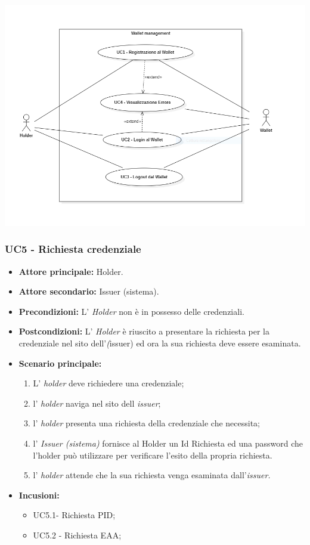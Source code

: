 \begin{center}
  \includegraphics[scale = 0.65]{./res/img/UC1.PNG}
\end{center}

\subsubsection{UC5 - Richiesta credenziale}
\begin{itemize}
\item \textbf{Attore principale:} Holder.
\item \textbf{Attore secondario:} Issuer (sistema). 
\item \textbf{Precondizioni:} L’ \textit{Holder} non è in possesso delle credenziali. 
\item \textbf{Postcondizioni:} L’ \textit{Holder} è riuscito a presentare la richiesta per la credenziale nel sito dell'\textit(issuer) ed ora la sua richiesta deve essere esaminata.
\item \textbf{Scenario principale:} 
    \begin{enumerate}
        \item L' \textit{holder} deve richiedere una credenziale; 
        \item l' \textit{holder} naviga nel sito dell \textit{issuer};
        \item l' \textit{holder} presenta una richiesta della credenziale che necessita;
        \item l' \textit{Issuer (sistema)} fornisce al Holder un Id Richiesta ed una password che l'holder può utilizzare per verificare l'esito della propria richiesta.
        \item l' \textit{holder} attende che la sua richiesta venga esaminata dall'\textit{issuer.}
    \end{enumerate}
\item \textbf{Incusioni:}
    \begin{itemize}
    \item UC5.1- Richiesta PID;
    \item UC5.2 - Richiesta EAA;
    \end{itemize}
\end{itemize}

